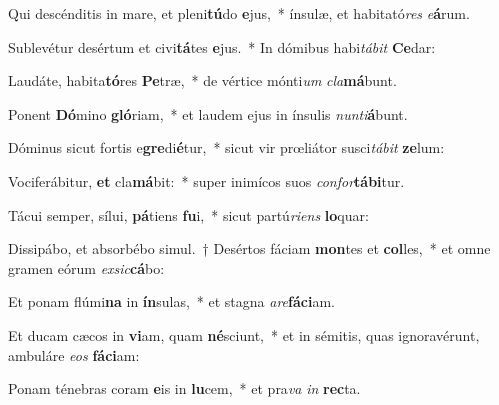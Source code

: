 \item Qui descénditis in mare, et pleni\textbf{tú}do \textbf{e}jus,~* ínsulæ, et habitató\textit{res} \textit{e}\textbf{á}rum.
\item Sublevétur desértum et civi\textbf{tá}tes \textbf{e}jus.~* In dómibus habi\textit{tá}\textit{bit} \textbf{Ce}dar:
\item Laudáte, habita\textbf{tó}res \textbf{Pe}træ,~* de vértice mónti\textit{um} \textit{cla}\textbf{má}bunt.
\item Ponent \textbf{Dó}mino \textbf{gló}riam,~* et laudem ejus in ínsulis \textit{nun}\textit{ti}\textbf{á}bunt.
\item Dóminus sicut fortis e\textbf{gre}di\textbf{é}tur,~* sicut vir prœliátor susci\textit{tá}\textit{bit} \textbf{ze}lum:
\item Vociferábitur, \textbf{et} cla\textbf{má}bit:~* super inimícos suos \textit{con}\textit{for}\textbf{tá}\textbf{bi}tur.
\item Tácui semper, sílui, \textbf{pá}tiens \textbf{fu}i,~* sicut partú\textit{ri}\textit{ens} \textbf{lo}quar:
\item Dissipábo, et absorbébo simul.~† Desértos fáciam \textbf{mon}tes et \textbf{col}les,~* et omne gramen eórum \textit{ex}\textit{sic}\textbf{cá}bo:
\item Et ponam flúmi\textbf{na} in \textbf{ín}sulas,~* et stagna \textit{a}\textit{re}\textbf{fá}\textbf{ci}am.
\item Et ducam cæcos in \textbf{vi}am, quam \textbf{né}sciunt,~* et in sémitis, quas ignoravérunt, ambuláre \textit{e}\textit{os} \textbf{fá}\textbf{ci}am:
\item Ponam ténebras coram \textbf{e}is in \textbf{lu}cem,~* et pra\textit{va} \textit{in} \textbf{rec}ta.
